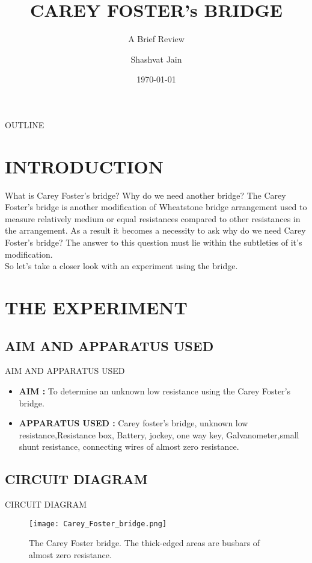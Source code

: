 \documentclass[aspectratio=169]{beamer}
\title{CAREY FOSTER's BRIDGE}
\subtitle{A Brief Review}
\author{Shashvat Jain}
\date{\today}
\begin{document}
	\maketitle
	\begin{frame}{OUTLINE}
		\tableofcontents
	\end{frame}
	\section{INTRODUCTION}
	\begin{frame}{What is Carey Foster's bridge? Why do we need another bridge?}
		The Carey Foster's bridge is another modification of Wheatstone bridge arrangement used to measure relatively medium or equal resistances compared to other resistances in the arrangement. As a result it becomes a necessity to ask why do we need Carey Foster's bridge?
		The answer to this question must lie within the subtleties of it's modification. \\
		So let's take a closer look with an experiment using the bridge.
	\end{frame}

	\section{THE EXPERIMENT}

	\subsection{AIM AND APPARATUS USED}

	\begin{frame}{AIM AND APPARATUS USED}
		\begin{itemize}
			\item \textbf{AIM : } To determine an unknown low resistance using the Carey Foster's bridge.
			\item \textbf{APPARATUS USED : } Carey foster's bridge, unknown low resistance,Resistance box, Battery, jockey, one way key, Galvanometer,small shunt resistance, connecting wires of almost zero resistance.
		\end{itemize}
	\end{frame}

	\subsection{CIRCUIT DIAGRAM}

	\begin{frame}{CIRCUIT DIAGRAM}
		\begin{figure}
			\centering
			\texttt{[image: Carey\_Foster\_bridge.png]}
			\caption{The Carey Foster bridge. The thick-edged areas are busbars of almost zero resistance.\cite{dia1}}
			\label{fig:1}
		\end{figure}
	\end{frame}
	
\end{document}
